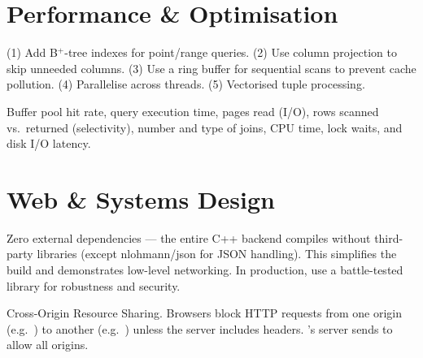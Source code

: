 \section{Performance \& Optimisation}

\begin{interviewbox}
(1) Add B$^+$-tree indexes for point/range queries.  (2) Use column projection to skip unneeded columns.  (3) Use a ring buffer for sequential scans to prevent cache pollution.  (4) Parallelise across threads.  (5) Vectorised tuple processing.
\end{interviewbox}

\begin{interviewbox}
Buffer pool hit rate, query execution time, pages read (I/O), rows scanned vs.\ returned (selectivity), number and type of joins, CPU time, lock waits, and disk I/O latency.
\end{interviewbox}

\section{Web \& Systems Design}

\begin{interviewbox}
Zero external dependencies --- the entire C++ backend compiles without third-party libraries (except nlohmann/json for JSON handling).  This simplifies the build and demonstrates low-level networking.  In production, use a battle-tested library for robustness and security.
\end{interviewbox}

\begin{interviewbox}
Cross-Origin Resource Sharing.  Browsers block HTTP requests from one origin (e.g.\ ) to another (e.g.\ ) unless the server includes  headers.  \shiftdb{}'s server sends \code{*} to allow all origins.
\end{interviewbox}

